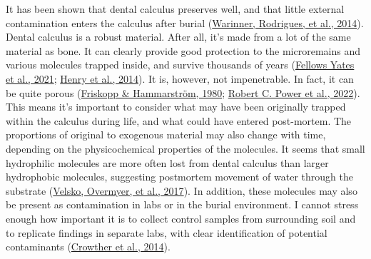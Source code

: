 \documentclass[
  letterpaper,
]{book}
\begin{document}
It has been shown that dental calculus preserves well, and that little
external contamination enters the calculus after burial
(\protect\hyperlink{ref-warinnerPathogensHost2014}{Warinner, Rodrigues,
et al., 2014}). Dental calculus is a robust material. After all, it's
made from a lot of the same material as bone. It can clearly provide
good protection to the microremains and various molecules trapped
inside, and survive thousands of years
(\protect\hyperlink{ref-yatesOralMicrobiome2021}{Fellows Yates et al.,
2021}; \protect\hyperlink{ref-henryNeanderthalCalculus2014}{Henry et
al., 2014}). It is, however, not impenetrable. In fact, it can be quite
porous (\protect\hyperlink{ref-friskoppComparativeScanning1980}{Friskopp
\& Hammarström, 1980};
\protect\hyperlink{ref-powerSynchrotronRadiationbased2022}{Robert C.
Power et al., 2022}). This means it's important to consider what may
have been originally trapped within the calculus during life, and what
could have entered post-mortem. The proportions of original to exogenous
material may also change with time, depending on the physicochemical
properties of the molecules. It seems that small hydrophilic molecules
are more often lost from dental calculus than larger hydrophobic
molecules, suggesting postmortem movement of water through the substrate
(\protect\hyperlink{ref-velskoDentalCalculus2017}{Velsko, Overmyer, et
al., 2017}). In addition, these molecules may also be present as
contamination in labs or in the burial environment. I cannot stress
enough how important it is to collect control samples from surrounding
soil and to replicate findings in separate labs, with clear
identification of potential contaminants
(\protect\hyperlink{ref-crowtherDocumentingContamination2014}{Crowther
et al., 2014}).
\end{document}
